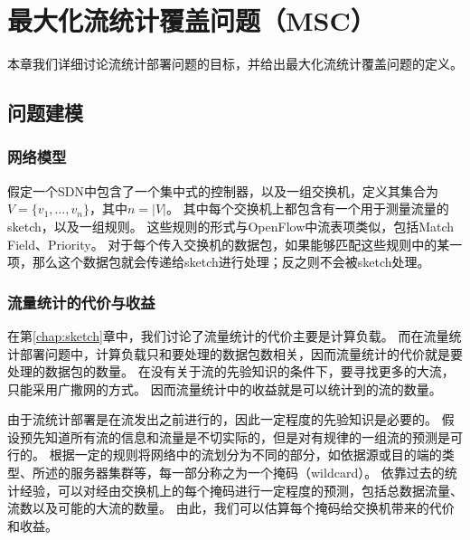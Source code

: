 \chapter{最大化流统计覆盖问题（MSC）}
本章我们详细讨论流统计部署问题的目标，并给出最大化流统计覆盖问题的定义。
\section{问题建模}

\subsection{网络模型}
假定一个SDN中包含了一个集中式的控制器，以及一组交换机，定义其集合为$V=\{v_1, ..., v_n\} $，其中$ n = |V| $。
其中每个交换机上都包含有一个用于测量流量的sketch，以及一组规则。
这些规则的形式与OpenFlow\cite{pfaff2012openflow}中流表项类似，包括Match Field、Priority。
对于每个传入交换机的数据包，如果能够匹配这些规则中的某一项，那么这个数据包就会传递给sketch进行处理；反之则不会被sketch处理。

\subsection{流量统计的代价与收益}
在第\ref{chap:sketch}章中，我们讨论了流量统计的代价主要是计算负载。
而在流量统计部署问题中，计算负载只和要处理的数据包数相关，因而流量统计的代价就是要处理的数据包的数量。
在没有关于流的先验知识的条件下，要寻找更多的大流，只能采用广撒网的方式。
因而流量统计中的收益就是可以统计到的流的数量。

由于流统计部署是在流发出之前进行的，因此一定程度的先验知识是必要的。
假设预先知道所有流的信息和流量是不切实际的，但是对有规律的一组流的预测是可行的。
根据一定的规则将网络中的流划分为不同的部分，如依据源或目的端的类型、所述的服务器集群等，每一部分称之为一个掩码（wildcard）\cite{xu2017miniming}。
依靠过去的统计经验，可以对经由交换机上的每个掩码进行一定程度的预测，包括总数据流量、流数以及可能的大流的数量。
由此，我们可以估算每个掩码给交换机带来的代价和收益。



